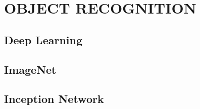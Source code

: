 \section{OBJECT RECOGNITION} \label{sec:obj-rec}

\subsection{Deep Learning } \label{sec:deeplearning-imagenet}
\subsection{ImageNet} \label{sec:imagenet}

\subsection{Inception Network } \label{sec:inceptionnet}
